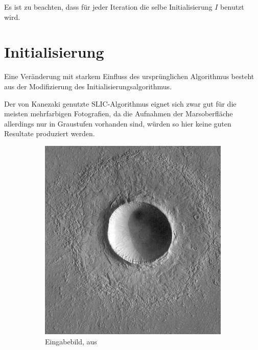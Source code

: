 Es ist zu beachten, dass für jeder Iteration die selbe Initialisierung $I$ benutzt wird.

\section{Initialisierung}
\label{sec:initialization}

Eine Veränderung mit starkem Einfluss des ursprünglichen Algorithmus besteht aus der Modifizierung des Initialisierungsalgorithmus.

Der von Kanezaki \etal genutzte SLIC-Algorithmus eignet sich zwar gut für die meisten mehrfarbigen Fotografien, da die Aufnahmen der Marsoberfläche allerdings nur in Graustufen vorhanden sind, würden so hier keine guten Resultate produziert werden.

\begin{figure}[h!]
	\centering
	\begin{subfigure}[t]{0.32\textwidth}
		\centering
		\includegraphics[width=\textwidth,keepaspectratio]{images/Gre13/Gre13_01.jpg}
		\captionsetup{format=plain,width=0.85\textwidth}
		\caption{Eingabebild, aus \cite[Kap.~7]{greeley_13}}
		\label{fig:slic_vs_tsugf_in}
	\end{subfigure}
	\hfill
	\begin{subfigure}[t]{0.32\textwidth}

\end{subfigure}
\end{figure}
